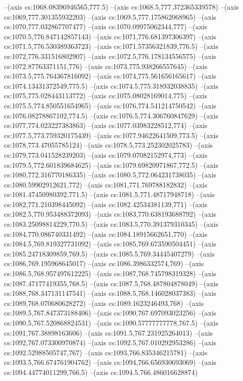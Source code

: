 --(axis cs:1068.08396946565,777.5)
--(axis cs:1068.5,777.372365339578)
--(axis cs:1069,777.301355932203)
--(axis cs:1069.5,777.175862068965)
--(axis cs:1070,777.032867707477)
--(axis cs:1070.09975062344,777)
--(axis cs:1070.5,776.847142857143)
--(axis cs:1071,776.681397306397)
--(axis cs:1071.5,776.530389363723)
--(axis cs:1071.57356321839,776.5)
--(axis cs:1072,776.331516802907)
--(axis cs:1072.5,776.178134556575)
--(axis cs:1072.87763371151,776)
--(axis cs:1073,775.938266557645)
--(axis cs:1073.5,775.764367816092)
--(axis cs:1074,775.561656165617)
--(axis cs:1074.13431372549,775.5)
--(axis cs:1074.5,775.318932038835)
--(axis cs:1075,775.028443113772)
--(axis cs:1075.08028169014,775)
--(axis cs:1075.5,774.850551654965)
--(axis cs:1076,774.541214750542)
--(axis cs:1076.08278867102,774.5)
--(axis cs:1076.5,774.306760847629)
--(axis cs:1077,774.023227383863)
--(axis cs:1077.03983228512,774)
--(axis cs:1077.5,773.759320175439)
--(axis cs:1077.94622641509,773.5)
--(axis cs:1078,773.47055785124)
--(axis cs:1078.5,773.252302025783)
--(axis cs:1079,773.041528239203)
--(axis cs:1079.07082152974,773)
--(axis cs:1079.5,772.601839684625)
--(axis cs:1079.69820971867,772.5)
--(axis cs:1080,772.316770186335)
--(axis cs:1080.5,772.064231738035)
--(axis cs:1080.59902912621,772)
--(axis cs:1081,771.769788182832)
--(axis cs:1081.47450980392,771.5)
--(axis cs:1081.5,771.48717948718)
--(axis cs:1082,771.210398445092)
--(axis cs:1082.42534381139,771)
--(axis cs:1082.5,770.953488372093)
--(axis cs:1083,770.638193688792)
--(axis cs:1083.25098814229,770.5)
--(axis cs:1083.5,770.391379310345)
--(axis cs:1084,770.086740331492)
--(axis cs:1084.18915662651,770)
--(axis cs:1084.5,769.819327731092)
--(axis cs:1085,769.673590504451)
--(axis cs:1085.24718309859,769.5)
--(axis cs:1085.5,769.34445407279)
--(axis cs:1086,769.195968645017)
--(axis cs:1086.3986332574,769)
--(axis cs:1086.5,768.957497612225)
--(axis cs:1087,768.745798319328)
--(axis cs:1087.47177419355,768.5)
--(axis cs:1087.5,768.487804878049)
--(axis cs:1088,768.347131147541)
--(axis cs:1088.5,768.146028037383)
--(axis cs:1089,768.070680628272)
--(axis cs:1089.1623246493,768)
--(axis cs:1089.5,767.847373188406)
--(axis cs:1090,767.697093023256)
--(axis cs:1090.5,767.520868824531)
--(axis cs:1090.57777777778,767.5)
--(axis cs:1091,767.38898163606)
--(axis cs:1091.5,767.231925264013)
--(axis cs:1092,767.073300970874)
--(axis cs:1092.5,767.010292953286)
--(axis cs:1092.52988505747,767)
--(axis cs:1093,766.835346215781)
--(axis cs:1093.5,766.674761904762)
--(axis cs:1094,766.656930693069)
--(axis cs:1094.44774011299,766.5)
--(axis cs:1094.5,766.486016628874)
